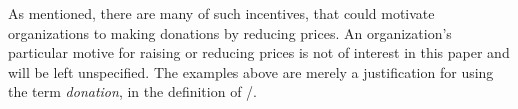 \documentclass[main.tex]{subfiles}
\begin{document}
        As mentioned, there are many of such incentives, 
        that could motivate organizations to making donations by reducing prices. 
        An organization's particular motive for raising or reducing prices
        is not of interest in this paper and will be left unspecified.
        The examples above are merely a justification for using the term \textit{donation},
        in the definition of \FVA/.
\end{document}
